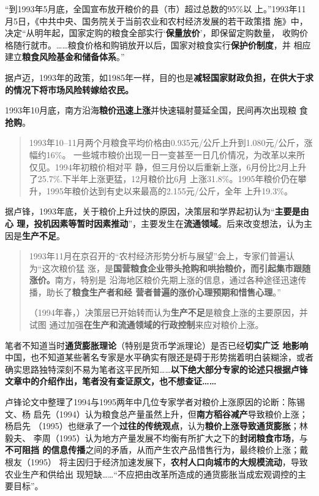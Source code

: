 “到1993年5月底，全国宣布放开粮价的县（市）超过总数的95\%以
上。”1993年11月5日，《中共中央、国务院关于当前农业和农村经济发展的若干政策措
施》中，决定“从明年起，国家定购的粮食全部实行‘\textbf{保量放价}’，即保留定购数量，
收购价格随行就市。……粮食价格和购销放开以后，国家对粮食实行\textbf{保护价制度}，并
相应建立\textbf{粮食风险基金和储备体系}。”

据卢迈，1993年的政策，如1985年一样，目的也是\textbf{减轻国家财政负担，在供大于求
  的情况下将市场风险转嫁给农民。}\cite{lumaisg}

1993年10月底，南方沿海\textbf{粮价迅速上涨}并快速辐射蔓延全国，民间再次出现粮
食\textbf{抢购}。
\begin{quotation}
  1993年10--11月两个月粮食平均价格由0.935元/公斤上升到1.080元/公斤，涨幅约16\%。
  一些城市粮价出现一日一变甚至一日几价情况，为改革以来所仅见。1994年初粮价相对平
  静，但三月份以后重新上涨，6月份比2月上升了25.7\%.下半年上涨更猛，12月粮价比6月
  上涨31.8\%。1995年粮价仍在攀升，1995年粮价达到有史以来最高的2.155元/公斤，全年
  上升19.3\%。\cite{lufengsanci}
\end{quotation}

据卢锋，1993年底，关于粮价上升过快的原因，决策层和学界起初认为“\textbf{主要是由心
  理，投机因素等暂时因素推动}”，主要发生在\textbf{流通领域}。后来改变想法，认为主
因是\textbf{生产不足}。
\begin{quotation}
  1993年11月在京召开的“农村经济形势分析与展望”会上，专家们普遍认为“这次粮价猛
  涨，是\textbf{国营粮食企业带头抢购和哄抬粮价，而引起集市跟随涨价。}南方，特别是
  沿海地区粮价先期上涨的信息，通过各种途径迅速传播，助长了\textbf{粮食生产者和经
    营者普遍的涨价心理预期和惜售心理}。”

  （1994年春，）决策层已开始转而认为\textbf{生产不足}是粮食上涨的主要原因，并试图
  通过加强\textbf{在生产和流通领域的行政控制}来应对粮价上涨。
\end{quotation}

笔者不知道当时\textbf{通货膨胀理论}（特别是货币学派理论）是否已经\textbf{切实广泛
  地影响}中国，也不知道某些著名专家是水平确实有限还是碍于形势揣着明白装糊涂，或者
确实思路独特深刻不易为笔者这平民所知……\textbf{以下绝大部分专家的论述只根据卢锋
  文章中的介绍作出，笔者没有查证原文，也不想查证……}

卢锋论文中整理了1994与1995两年中几位专家学者对粮价上涨原因的论断：陈锡文、杨
启先（1994）认为粮食总产量虽然上升，但\textbf{南方稻谷减产}导致粮价上涨；杨启先
（1995）也继承了一个\textbf{过往的传统观点}，认为\textbf{粮价上涨导致通货膨胀}；林毅夫、
李周（1995）认为地方产量发展不均衡有所扩大之下的\textbf{封闭粮食市场}，与\textbf{不可阻挡
  的信息传播}之间的矛盾，从而产生农产品惜售行为，最终粮价上涨；戴根友（1995）
将主因归于经济加速发展下，\textbf{农村人口向城市的大规模流动}，导致农业生产和供给出
现短缺……“不应把由改革所造成的通货膨胀当成宏观调控的主要目标”。

